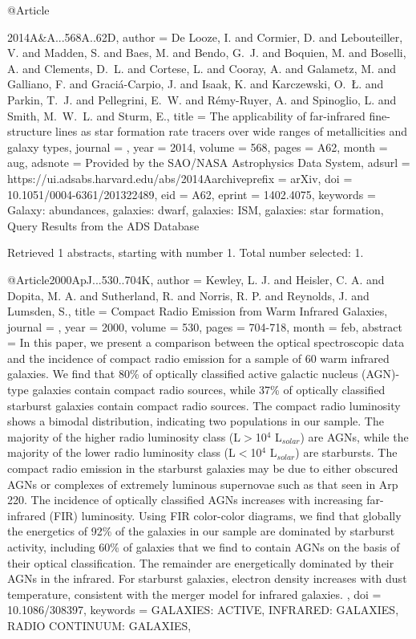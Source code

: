 \documentclass[longauth]{aa}
\begin{document}
{{{{{@Article{2014A&A...568A..62D,
  author        = {{De Looze}, I. and {Cormier}, D. and {Lebouteiller}, V. and {Madden}, S. and {Baes}, M. and {Bendo}, G.~J. and {Boquien}, M. and {Boselli}, A. and {Clements}, D.~L. and {Cortese}, L. and {Cooray}, A. and {Galametz}, M. and {Galliano}, F. and {Graci{\'a}-Carpio}, J. and {Isaak}, K. and {Karczewski}, O.~{\L}. and {Parkin}, T.~J. and {Pellegrini}, E.~W. and {R{\'e}my-Ruyer}, A. and {Spinoglio}, L. and {Smith}, M.~W.~L. and {Sturm}, E.},
  title         = {The applicability of far-infrared fine-structure lines as star formation rate tracers over wide ranges of metallicities and galaxy types},
  journal       = {\aap},
  year          = {2014},
  volume        = {568},
  pages         = {A62},
  month         = aug,
  adsnote       = {Provided by the SAO/NASA Astrophysics Data System},
  adsurl        = {https://ui.adsabs.harvard.edu/abs/2014Aarchiveprefix = {arXiv},
  doi           = {10.1051/0004-6361/201322489},
  eid           = {A62},
  eprint        = {1402.4075},
  keywords      = {Galaxy: abundances, galaxies: dwarf, galaxies: ISM, galaxies: star formation},
}
Query Results from the ADS Database


Retrieved 1 abstracts, starting with number 1.  Total number selected: 1.

@Article{2000ApJ...530..704K,
  author   = {Kewley, L. J. and Heisler, C. A. and Dopita, M. A. and Sutherland, R. and Norris, R. P. and Reynolds, J. and Lumsden, S.},
  title    = {Compact Radio Emission from Warm Infrared Galaxies},
  journal  = {\apj},
  year     = {2000},
  volume   = {530},
  pages    = {704-718},
  month    = feb,
  abstract = {In this paper, we present a comparison between the optical spectroscopic
data and the incidence of compact radio emission for a sample of 60 warm
infrared galaxies. We find that 80\% of optically classified active
galactic nucleus (AGN)-type galaxies contain compact radio sources,
while 37\% of optically classified starburst galaxies contain compact
radio sources. The compact radio luminosity shows a bimodal
distribution, indicating two populations in our sample. The majority of
the higher radio luminosity class (L$\gt$10$^{4}$
L$_{solar}$) are AGNs, while the majority of the lower radio
luminosity class (L$\lt$10$^{4}$ L$_{solar}$) are starbursts.
The compact radio emission in the starburst galaxies may be due to
either obscured AGNs or complexes of extremely luminous supernovae such
as that seen in Arp 220. The incidence of optically classified AGNs
increases with increasing far-infrared (FIR) luminosity. Using FIR
color-color diagrams, we find that globally the energetics of 92\% of the
galaxies in our sample are dominated by starburst activity, including
60\% of galaxies that we find to contain AGNs on the basis of their
optical classification. The remainder are energetically dominated by
their AGNs in the infrared. For starburst galaxies, electron density
increases with dust temperature, consistent with the merger model for
infrared galaxies.
},
  doi      = {10.1086/308397},
  keywords = {GALAXIES: ACTIVE, INFRARED: GALAXIES, RADIO CONTINUUM: GALAXIES},
}

}}}}}}
\end{document}
